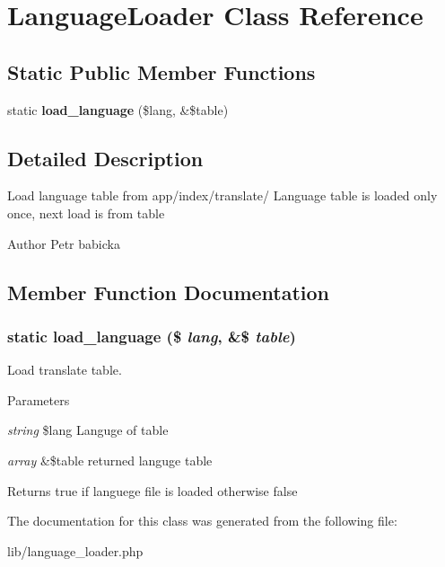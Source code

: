 \section{LanguageLoader Class Reference}
\label{class_language_loader}
\subsection*{Static Public Member Functions}
\begin{DoxyCompactItemize}
\item 
static {\bf load\_\-language} (\$lang, \&\$table)
\end{DoxyCompactItemize}


\subsection{Detailed Description}
Load language table from app/index/translate/ Language table is loaded only once, next load is from table

\begin{DoxyAuthor}{Author}
Petr babicka 
\end{DoxyAuthor}


\subsection{Member Function Documentation}
\subsubsection[{load\_\-language}]{\setlength{\rightskip}{0pt plus 5cm}static load\_\-language (\$ {\em lang}, \/  \&\$ {\em table})\hspace{0.3cm}{\ttfamily  [static]}}\label{class_language_loader_a702b28a903df7fe2ae6811bbe2061ccb}
Load translate table. 
\begin{DoxyParams}{Parameters}
\item[{\em string}]\$lang Languge of table \item[{\em array}]\&\$table returned languge table \end{DoxyParams}
\begin{DoxyReturn}{Returns}
true if languege file is loaded otherwise false 
\end{DoxyReturn}


The documentation for this class was generated from the following file:\begin{DoxyCompactItemize}
\item 
lib/language\_\-loader.php\end{DoxyCompactItemize}
